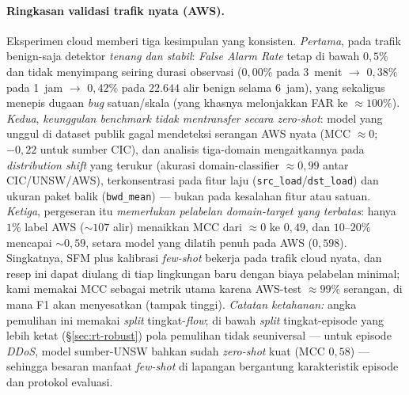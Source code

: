 \documentclass[11pt,a4paper]{article}
\begin{document}
\paragraph{Ringkasan validasi trafik nyata (AWS).} Eksperimen cloud memberi tiga
kesimpulan yang konsisten. \emph{Pertama}, pada trafik benign-saja detektor
\emph{tenang dan stabil}: \emph{False Alarm Rate} tetap di bawah $0{,}5\%$ dan tidak
menyimpang seiring durasi observasi ($0{,}00\%$ pada 3~menit $\rightarrow$
$0{,}38\%$ pada 1~jam $\rightarrow$ $0{,}42\%$ pada $22{.}644$ alir benign selama
6~jam), yang sekaligus menepis dugaan \emph{bug} satuan/skala (yang khasnya
melonjakkan FAR ke $\approx 100\%$). \emph{Kedua}, \emph{keunggulan benchmark tidak
mentransfer secara zero-shot}: model yang unggul di dataset publik gagal mendeteksi
serangan AWS nyata (MCC $\approx 0$; $-0{,}22$ untuk sumber CIC), dan analisis
tiga-domain mengaitkannya pada \emph{distribution shift} yang terukur (akurasi
domain-classifier $\approx 0{,}99$ antar CIC/UNSW/AWS), terkonsentrasi pada fitur
laju (\texttt{src\_load}/\texttt{dst\_load}) dan ukuran paket balik
(\texttt{bwd\_mean}) --- bukan pada kesalahan fitur atau satuan. \emph{Ketiga},
pergeseran itu \emph{memerlukan pelabelan domain-target yang terbatas}: hanya $1\%$ label AWS ($\sim$$107$
alir) menaikkan MCC dari $\approx 0$ ke $0{,}49$, dan $10$--$20\%$ mencapai
$\sim 0{,}59$, setara model yang dilatih penuh pada AWS ($0{,}598$). Singkatnya, SFM
plus kalibrasi \emph{few-shot} bekerja pada trafik cloud nyata, dan resep ini dapat
diulang di tiap lingkungan baru dengan biaya pelabelan minimal; kami memakai MCC
sebagai metrik utama karena AWS-test $\approx 99\%$ serangan, di mana F1 akan
menyesatkan (tampak tinggi). \emph{Catatan ketahanan:} angka pemulihan ini memakai
\emph{split} tingkat-\emph{flow}; di bawah \emph{split} tingkat-episode yang lebih ketat
(\S\ref{sec:rt-robust}) pola pemulihan tidak seuniversal --- untuk episode \emph{DDoS},
model sumber-UNSW bahkan sudah \emph{zero-shot} kuat (MCC $0{,}58$) --- sehingga besaran
manfaat \emph{few-shot} di lapangan bergantung karakteristik episode dan protokol evaluasi.
\end{document}
